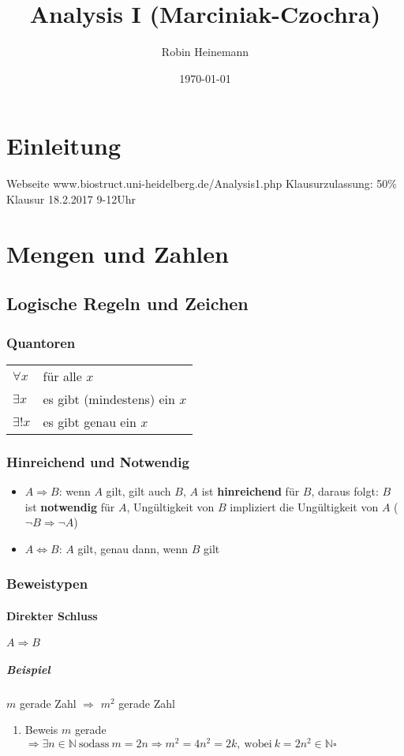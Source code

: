 \documentclass[a4paper]{scrartcl}
\author{Robin Heinemann}
\date{\today}
\title{Analysis I (Marciniak-Czochra)}
\DeclareMathOperator{\Forall}{\forall}%
\begin{document}
\maketitle
\tableofcontents


\section{Einleitung}
\label{sec-1}
Webseite www.biostruct.uni-heidelberg.de/Analysis1.php
Klausurzulassung: 50\%
Klausur 18.2.2017 9-12Uhr
\section{Mengen und Zahlen}
\label{sec-2}
\subsection{Logische Regeln und Zeichen}
\label{sec-2-1}
\subsubsection{Quantoren}
\label{sec-2-1-1}
\begin{center}
\begin{tabular}{ll}
$\Forall x$ & für alle $x$\\
$\exists x$ & es gibt (mindestens) ein $x$\\
$\exists! x$ & es gibt genau ein $x$\\
\end{tabular}
\end{center}
\subsubsection{Hinreichend und Notwendig}
\label{sec-2-1-2}
\begin{itemize}
\item $A\Rightarrow B$: wenn $A$ gilt, gilt auch $B$, $A$ ist \textbf{hinreichend} für $B$, daraus folgt: $B$ ist \textbf{notwendig} für $A$, Ungültigkeit von $B$ impliziert die Ungültigkeit von $A$ ($\neg B \Rightarrow \neg A$)
\item $A \Leftrightarrow B$: $A$ gilt, genau dann, wenn $B$ gilt
\end{itemize}
\subsubsection{Beweistypen}
\label{sec-2-1-3}
\paragraph{Direkter Schluss}
\label{sec-2-1-3-1}
$A\Rightarrow B$
\subparagraph{Beispiel}
\label{sec-2-1-3-1-1}
$m$ gerade Zahl $\Rightarrow$ $m^2$ gerade Zahl
\begin{enumerate}
\item Beweis
\label{sec-2-1-3-1-1-1}
$m$ gerade $\Rightarrow \exists n\in\mathbb{N}~\text{sodass}~m = 2n \Rightarrow m^2 = 4n^2 = 2k,~\text{wobei}~k=2n^2\in\mathbb{N} \square$
\end{enumerate}
\end{document}
